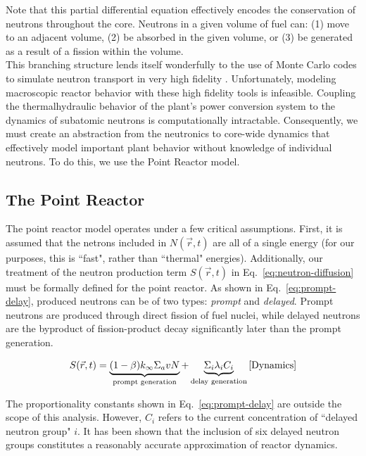 \documentclass[review,onefignum,onetabnum]{siamart171218}
\begin{document}
Note that this partial differential equation effectively encodes the
conservation of neutrons throughout the core. Neutrons in a given volume of
fuel can: (1) move to an adjacent volume, (2) be absorbed in the given
volume, or (3) be generated as a result of a fission within the volume.\\

This branching structure lends itself wonderfully to the use of
Monte Carlo codes to simulate neutron transport in very high fidelity \cite{Serpent}.
Unfortunately, modeling macroscopic reactor behavior with these high fidelity
tools is infeasible. Coupling the thermalhydraulic behavior of the plant's
power conversion system to the dynamics of subatomic neutrons is
computationally intractable. Consequently, we must create an abstraction from
the neutronics to core-wide dynamics that effectively model important plant
behavior without knowledge of individual neutrons. To do this, we use the
Point Reactor model.

\subsection{The Point Reactor}
The point reactor model operates under a few critical assumptions. First,
it is assumed that the netrons included in $N(\vec{r}, t)$ are all of a single
energy (for our purposes, this is ``fast", rather than ``thermal" energies).
Additionally, our treatment of the neutron production term $S(\vec{r}, t)$
in Eq.~\cref{eq:neutron-diffusion} must be formally defined for the point
reactor. As shown in Eq.~\cref{eq:prompt-delay}, produced neutrons can be of
two types: \emph{prompt} and \emph{delayed}. Prompt neutrons are produced
through direct fission of fuel nuclei, while delayed neutrons are the
byproduct of fission-product decay significantly later than the prompt
generation.

\begin{equation}
  S(\vec{r}, t) = \underbrace{(1-\beta)k_{\infty}\Sigma_avN}_{\text{prompt generation}} + \underbrace{\Sigma_i\lambda_iC_i}_{\text{delay generation}}
  \label{eq:prompt-delay}\cite{Dynamics}
\end{equation}

The proportionality constants shown in Eq.~\cref{eq:prompt-delay} are outside
the scope of this analysis. However, $C_i$ refers to the current concentration
of ``delayed neutron group" $i$. It has been shown that the inclusion of six
delayed neutron groups constitutes a reasonably accurate approximation of reactor
dynamics.\cite{Keepin} \\
\end{document}
